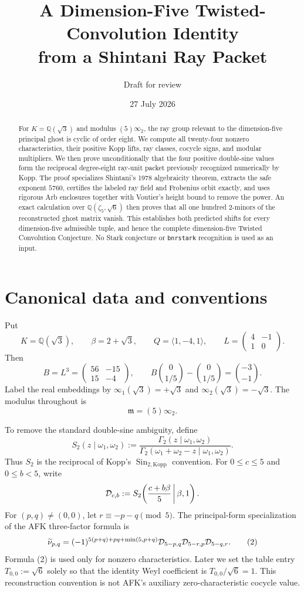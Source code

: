 \documentclass[11pt]{article}
\title{A Dimension-Five Twisted-Convolution Identity\\
from a Shintani Ray Packet}
\author{Draft for review}
\date{27 July 2026}
\newcommand{\Q}{\mathbb Q}
\begin{document}
\maketitle

\begin{abstract}
For $K=\Q(\sqrt3)$ and modulus $(5)\infty_2$, the ray group relevant
to the dimension-five principal ghost is cyclic of order eight.  We
compute all twenty-four nonzero characteristics, their positive Kopp
lifts, ray classes, cocycle signs, and modular multipliers.  We then
prove unconditionally that the four positive double-sine values form
the reciprocal degree-eight ray-unit packet previously recognized
numerically by Kopp.  The proof specializes Shintani's 1978
algebraicity theorem, extracts the safe exponent $5760$, certifies the
labeled ray field and Frobenius orbit exactly, and uses rigorous Arb
enclosures together with Voutier's height bound to remove the power.
An exact calculation over $\Q(\zeta_5,\sqrt6)$ then proves that all one
hundred $2$-minors of the reconstructed ghost matrix vanish.  This
establishes both predicted shifts for every dimension-five admissible
tuple, and hence the complete dimension-five Twisted Convolution
Conjecture.  No Stark conjecture or \texttt{bnrstark} recognition is
used as an input.
\end{abstract}

\section{Canonical data and conventions}

Put
\[
 K=\Q(\sqrt3),\qquad \beta=2+\sqrt3,\qquad
 Q=\langle1,-4,1\rangle,\qquad
 L=\begin{pmatrix}4&-1\\1&0\end{pmatrix}.
\]
Then
\[
 B=L^3=\begin{pmatrix}56&-15\\15&-4\end{pmatrix},\qquad
 B\binom0{1/5}-\binom0{1/5}=\binom{-3}{-1}.
\]
Label the real embeddings by
$\infty_1(\sqrt3)=+\sqrt3$ and
$\infty_2(\sqrt3)=-\sqrt3$.  The modulus throughout is
\[
 \mathfrak m=(5)\infty_2.
\]

To remove the standard double-sine ambiguity, define
\[
 S_2(z\mid\omega_1,\omega_2)
 :=\frac{\Gamma_2(z\mid\omega_1,\omega_2)}
 {\Gamma_2(\omega_1+\omega_2-z\mid\omega_1,\omega_2)}.
\tag{1}
\]
Thus $S_2$ is the reciprocal of Kopp's
$\operatorname{Sin}_{2,\mathrm{Kopp}}$ convention.
For $0\le c\le5$ and $0\le b<5$, write
\[
 {\cal D}_{c,b}:=
 S_2\!\left(\frac{c+b\beta}{5}\,\middle|\,\beta,1\right).
\]
For $(p,q)\ne(0,0)$, let $r\equiv-p-q\pmod5$.  The principal-form
specialization of the AFK three-factor formula is
\[
 \widetilde\nu_{p,q}
 =(-1)^{5(p+q)+pq+\min(5,p+q)}
 {\cal D}_{5-p,q}{\cal D}_{5-r,p}{\cal D}_{5-q,r}.
\tag{2}
\]
Formula (2) is used only for nonzero characteristics.  Later we set the
table entry $T_{0,0}:=\sqrt6$ solely so that the identity Weyl
coefficient is $T_{0,0}/\sqrt6=1$.  This reconstruction convention is
not AFK's auxiliary zero-characteristic cocycle value.
\end{document}
